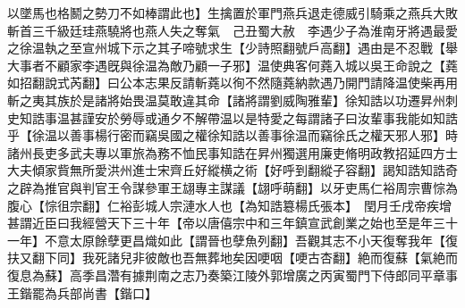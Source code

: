 以墜馬也格鬭之勢刀不如棒謂此也】生擒置於軍門燕兵退走德威引騎乘之燕兵大敗斬首三千級廷珪燕驍將也燕人失之奪氣　己丑蜀大赦　李遇少子為淮南牙將遇最愛之徐温執之至宣州城下示之其子啼號求生【少詩照翻號戶高翻】遇由是不忍戰【舉大事者不顧家李遇旣與徐温為敵乃顧一子邪】温使典客何蕘入城以吳王命說之【蕘如招翻說式芮翻】曰公本志果反請斬蕘以徇不然隨蕘納款遇乃開門請降温使柴再用斬之夷其族於是諸將始畏温莫敢違其命【諸將謂劉威陶雅輩】徐知誥以功遷昇州刺史知誥事温甚謹安於勞辱或通夕不解帶温以是特愛之每謂諸子曰汝輩事我能如知誥乎【徐温以善事楊行密而竊吳國之權徐知誥以善事徐温而竊徐氏之權天邪人邪】時諸州長吏多武夫專以軍旅為務不恤民事知誥在昇州獨選用廉吏脩明政教招延四方士大夫傾家貲無所愛洪州進士宋齊丘好縱横之術【好呼到翻縱子容翻】謁知誥知誥奇之辟為推官與判官王令謀參軍王翃專主謀議【翃呼萌翻】以牙吏馬仁裕周宗曹悰為腹心【悰徂宗翻】仁裕彭城人宗漣水人也【為知誥簒楊氏張本】　閏月壬戌帝疾增甚謂近臣曰我經營天下三十年【帝以唐僖宗中和三年鎮宣武創業之始也至是年三十一年】不意太原餘孽更昌熾如此【謂晉也孽魚列翻】吾觀其志不小天復奪我年【復扶又翻下同】我死諸兒非彼敵也吾無葬地矣因哽咽【哽古杏翻】絶而復蘇【氣絶而復息為蘇】高季昌濳有據荆南之志乃奏築江陵外郭增廣之丙寅蜀門下侍郎同平章事王鍇罷為兵部尚書【鍇口】

